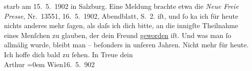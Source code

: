 \begin{ledgroupsized}[t]{13cm}
{{{                   starb am
                     15. 5. 1902 in Salzburg. Eine Meldung brachte etwa die \emph{Neue Freie Presse}, Nr. 13551,
                        16. 5. 1902, Abendblatt, S. 2.}}}\label{K_L01220_1h}
               iſt, und ſo ka{\geminationn} ich für heute nichts anderes mehr ſagen,
               als daſs ich dich bitte, an die innigſte {\pb}Theilnahme eines
               Menſchen zu glauben, der dein Freund \uline{geworden} iſt.
               Und was man ſo allmälig wurde, bleibt man – beſonders in unſeren Jahren. Nicht mehr
               für heute. Ich hoffe dich bald zu ſehen.\pend
           \pstart
           In Treue dein{\\[\baselineskip]}\spacefill\mbox{Arthur}\pend
           \leftskip=0em{}\pstart
           Wien16. 5. 902\pend
           \endnumbering{}\end{ledgroupsized}  \newcommand{\dateiname}{L01220}\newcommand{\titel}{Arthur Schnitzler an Hermann Bahr, 16. 5. 1902}\newcommand{\editorInnen}{ Kurt Ifkovits,  Martin Anton Müller}
      